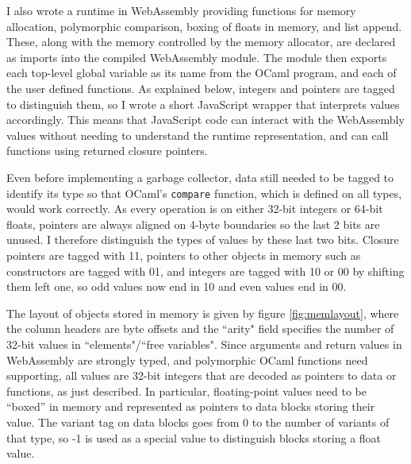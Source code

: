 I also wrote a runtime in WebAssembly providing functions for memory allocation, polymorphic comparison, boxing of floats in memory, and list append. These, along with the memory controlled by the memory allocator, are declared as imports into the compiled WebAssembly module. The module then exports each top-level global variable as its name from the OCaml program, and each of the user defined functions. 
As explained below, integers and pointers are tagged to distinguish them, so I wrote a short JavaScript wrapper that interprets values accordingly. This means that JavaScript code can interact with the WebAssembly values without needing to understand the runtime representation, and can call functions using returned closure pointers.


Even before implementing a garbage collector, data still needed to be tagged to identify its type so that OCaml's \verb|compare| function, which is defined on all types, would work correctly. As every operation is on either 32-bit integers or 64-bit floats, pointers are always aligned on 4-byte boundaries so the last 2 bits are unused. I therefore distinguish the types of values by these last two bits. Closure pointers are tagged with 11, pointers to other objects in memory such as constructors are tagged with 01, and integers are tagged with 10 or 00 by shifting them left one, so odd  values now end in 10 and even values end in 00. 

The layout of objects stored in memory is given by figure \ref{fig:memlayout}, where the column headers are byte offsets and the ``arity" field specifies the number of 32-bit values in ``elements"/``free variables". Since arguments and return values in WebAssembly are strongly typed, and polymorphic OCaml functions need supporting, all values are 32-bit integers that are decoded as pointers to data or functions, as just described. In particular, floating-point values need to be ``boxed'' in memory and represented as pointers to data blocks storing their value. The variant tag on data blocks goes from 0 to the number of variants of that type, so -1 is used as a special value to distinguish blocks storing a float value.\\

